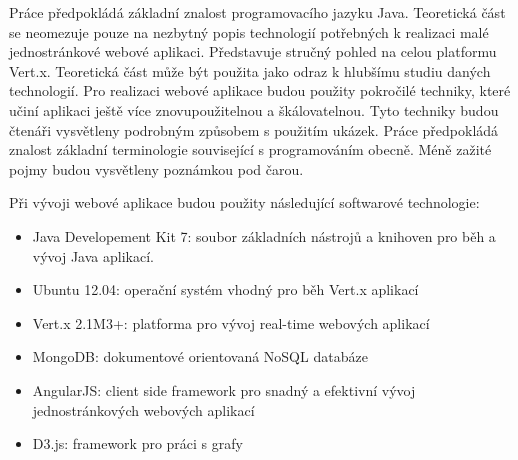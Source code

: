 Práce předpokládá základní znalost programovacího jazyku Java. Teoretická část se neomezuje pouze na nezbytný popis technologií potřebných k realizaci malé jednostránkové webové aplikaci. Představuje stručný pohled na celou platformu Vert.x. Teoretická část může být použita jako odraz k hlubšímu studiu daných technologií. Pro realizaci webové aplikace budou použity pokročilé techniky, které učiní aplikaci ještě více znovupoužitelnou a škálovatelnou. Tyto techniky budou čtenáři vysvětleny podrobným způsobem s použitím ukázek. Práce předpokládá znalost základní terminologie související s programováním obecně. Méně zažité pojmy budou vysvětleny poznámkou pod čarou.

Při vývoji webové aplikace budou použity následující softwarové technologie:
\begin{itemize}
\item Java Developement Kit 7: soubor základních nástrojů a knihoven pro běh a vývoj Java aplikací.
\item Ubuntu 12.04: operační systém vhodný pro běh Vert.x aplikací
\item Vert.x 2.1M3+: platforma pro vývoj real-time webových aplikací
\item MongoDB: dokumentové orientovaná NoSQL databáze
\item AngularJS: client side framework pro snadný a efektivní vývoj jednostránkových webových aplikací
\item D3.js: framework pro práci s grafy
\end{itemize}